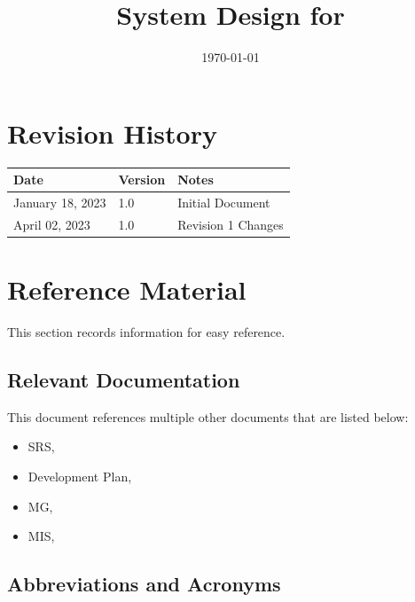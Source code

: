 \documentclass[12pt, titlepage]{article}
\begin{document}
\title{System Design for \progname{}} 
\author{\authname}
\date{\today}

\maketitle


\section{Revision History}

\begin{tabularx}{\textwidth}{p{3cm}p{2cm}X}
\toprule {\bf Date} & {\bf Version} & {\bf Notes}\\
\midrule
January 18, 2023 & 1.0 & Initial Document\\
April 02, 2023 & 1.0 & Revision 1 Changes\\
\bottomrule
\end{tabularx}

\newpage

\section{Reference Material}

This section records information for easy reference.
\subsection{Relevant Documentation}
This document references multiple other documents that are listed below:

\begin{itemize}
	\item SRS, \cite{SRS}
	\item Development Plan, \cite{DevelopmentPlan}
	\item MG, \cite{MG}
	\item MIS, \cite{MIS}
\end{itemize}

\subsection{Abbreviations and Acronyms}
\end{document}
